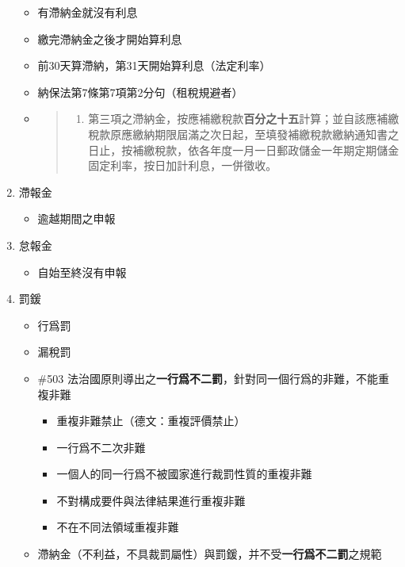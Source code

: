 \documentclass[]{ctexbook}
\providecommand{\tightlist}{%
  \setlength{\itemsep}{0pt}\setlength{\parskip}{0pt}}
\begin{document}
\begin{enumerate}
  \begin{itemize}
  \item
    有滯納金就沒有利息
  \item
    繳完滯納金之後才開始算利息
  \item
    前30天算滯納，第31天開始算利息（法定利率）
  \item
    納保法第7條第7項第2分句（租稅規避者）
  \item
    \begin{quote}
    \begin{enumerate}
    \def\labelenumii{\arabic{enumii}.}
    \setcounter{enumii}{6}
    \tightlist
    \item
      第三項之滯納金，按應補繳稅款\textbf{百分之十五}計算；並自該應補繳稅款原應繳納期限屆滿之次日起，至填發補繳稅款繳納通知書之日止，按補繳稅款，依各年度一月一日郵政儲金一年期定期儲金固定利率，按日加計利息，一併徵收。
    \end{enumerate}
    \end{quote}
  \end{itemize}
\item
  滯報金

  \begin{itemize}
  \tightlist
  \item
    逾越期間之申報
  \end{itemize}
\item
  怠報金

  \begin{itemize}
  \tightlist
  \item
    自始至終沒有申報
  \end{itemize}
\item
  罰鍰

  \begin{itemize}
  \tightlist
  \item
    行爲罰
  \item
    漏稅罰
  \item
    \#503 法治國原則導出之\textbf{一行爲不二罰}，針對同一個行爲的非難，不能重複非難

    \begin{itemize}
    \tightlist
    \item
      重複非難禁止（德文：重複評價禁止）
    \item
      一行爲不二次非難
    \item
      一個人的同一行爲不被國家進行裁罰性質的重複非難
    \item
      不對構成要件與法律結果進行重複非難
    \item
      不在不同法領域重複非難
    \end{itemize}
  \item
    滯納金（不利益，不具裁罰屬性）與罰鍰，并不受\textbf{一行爲不二罰}之規範
  \end{itemize}
\end{enumerate}
\end{document}
